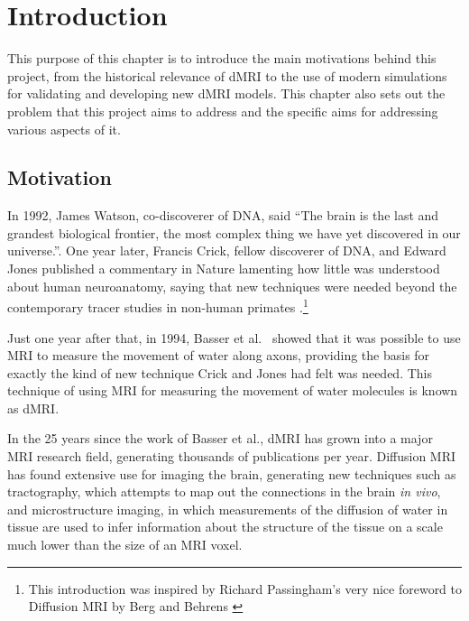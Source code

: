 \renewcommand{\LifeChapter}{y}
\chapter{Introduction}
\label{chap:introduction}

\chaptertoc{}

\begin{chapterabstract}
  This purpose of this chapter is to introduce the main motivations behind this project, from the historical relevance of \acl{dMRI} to the use of modern simulations for validating and developing new \acl{dMRI} models.
  This chapter also sets out the problem that this project aims to address and the specific aims for addressing various aspects of it.
\end{chapterabstract}

\section{Motivation}
\label{sec:intro_motivation}
In 1992, James Watson, co-discoverer of DNA, said ``The brain is the last and grandest biological frontier, the most complex thing we have yet discovered in our universe.''\cite{NAP1785}.
One year later, Francis Crick, fellow discoverer of DNA, and Edward Jones published a commentary in Nature lamenting how little was understood about human neuroanatomy, saying that new techniques were needed beyond the contemporary tracer studies in non-human primates \cite{Crick1993}.\footnote{This introduction was inspired by Richard Passingham's very nice foreword to Diffusion MRI by Berg and Behrens \cite{Johansen-Berg2013}}

Just one year after that, in 1994, Basser et al.\ \cite{Basser1994} showed that it was possible to use \ac{MRI} to measure the movement of water along axons, providing the basis for exactly the kind of new technique Crick and Jones had felt was needed.
This technique of using \ac{MRI} for measuring the movement of water molecules is known as \ac{dMRI}.

In the 25 years since the work of Basser et al., \acl{dMRI} has grown into a major \ac{MRI} research field, generating thousands of publications per year.
Diffusion MRI has found extensive use for imaging the brain, generating new techniques such as tractography, which attempts to map out the connections in the brain \emph{in vivo}, and microstructure imaging, in which measurements of the diffusion of water in tissue are used to infer information about the structure of the tissue on a scale much lower than the size of an MRI voxel.

